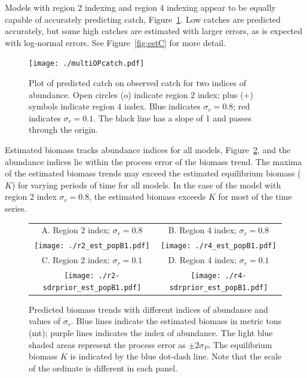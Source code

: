 \documentclass[12pt,letterpaper]{article}
\begin{document}
\pagebreak[4]
Models with region 2 indexing and region 4 indexing appear to be
equally capable of accurately predicting catch,
Figure~\ref{fig:mopcatch}. Low catches are predicted
accurately, but some high catches are estimated with larger errors, as is
expected with log-normal errors. 
See Figure~\ref{fig:estC} for more detail.

\begin{figure}
\begin{center}
\texttt{[image: ./multiOPcatch.pdf]}
\caption{Plot of predicted catch on observed catch for two indices of
abundance.
Open circles (o) indicate region 2 index; plus (+) symbols indicate
region 4 index.
Blue indicates $\sigma_r=0.8$; red indicates $\sigma_r=0.1$.
The black line has a slope of 1 and passes through the origin.
\label{fig:mopcatch}
}
\end{center}
\end{figure}

Estimated biomass tracks abundance indices for all models,
Figure~\ref{fig:estbiomass}, and the abundance indices lie within the
process error of the biomass trend.
The maxima of the estimated biomass trends may exceed the
estimated equilibrium biomass ($K$) for varying periods of time for
all models.
In the case of the model with region 2 index $\sigma_r=0.8$,
the estimated biomass exceeds $K$
for most of the time series.

\begin{figure}
\begin{center}
{\scriptsize \sffamily
\begin{tabular}{cc}
A. Region 2 index; $\sigma_r=0.8$ &
B. Region 4 index; $\sigma_r=0.8$ \\
\texttt{[image: ./r2\_est\_popB1.pdf]} &
\texttt{[image: ./r4\_est\_popB1.pdf]} \\
C. Region 2 index; $\sigma_r=0.1$ &
D. Region 4 index; $\sigma_r=0.1$ \\
\texttt{[image: ./r2-sdrprior\_est\_popB1.pdf]} &
\texttt{[image: ./r4-sdrprior\_est\_popB1.pdf]} \\
\end{tabular}
}
\caption{Predicted biomass trends with different indices of abundance
and values of $\sigma_r$.
Blue lines indicate the estimated biomass in metric tons (mt);
purple lines indicates the index of abundance.
The light blue shaded areas represent the process error as 
$\pm 2\sigma_P$.
The equilibrium biomass $K$ is indicated by the blue dot-dash line.
Note that the scale of the ordinate is different in each panel.
\label{fig:estbiomass}}
\end{center}
\end{figure}
\end{document}
